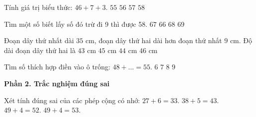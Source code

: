 \begin{ex} %
Tính giá trị biểu thức: $46 + 7 + 3$.
\choice
{$55$}
{\True $56$}
{$57$}
{$58$}
\end{ex}

\begin{ex} %
Tìm một số biết lấy số đó trừ đi 9 thì được 58.
\choice
{\True $67$}
{$66$}
{$68$}
{$69$}
\end{ex}

\begin{ex} %
Đoạn dây thứ nhất dài $35\text{ cm}$, đoạn dây thứ hai dài hơn đoạn thứ nhất $9\text{ cm}$. Độ dài đoạn dây thứ hai là
\choice
{$43\text{ cm}$}
{$45\text{ cm}$}
{\True $44\text{ cm}$}
{$46\text{ cm}$}
\end{ex}

\begin{ex} %
Tìm số thích hợp điền vào ô trống: $48 + \dots = 55$.
\choice
{$6$}
{\True $7$}
{$8$}
{$9$}
\end{ex}

\textbf{Phần 2. Trắc nghiệm đúng sai}

\begin{ex} %
Xét tính đúng sai của các phép cộng có nhớ:
\choiceTF
{\True $27 + 6 = 33$.}
{\True $38 + 5 = 43$.}
{$49 + 4 = 52$.}
{\True $49 + 4 = 53$.}
\end{ex}

